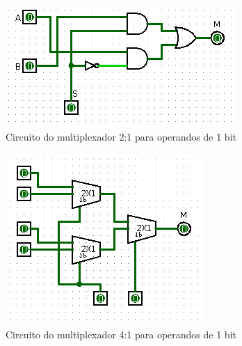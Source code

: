 \documentclass[
	12pt,				%
	openright,			%
	twoside,			%
	a4paper,			%
	english,			%
	french,				%
	spanish,			%
	brazil,				%
	]{abntex2}
\begin{document}
\begin{figure}[H]
	\begin{center}
	    \includegraphics[scale=0.6]{mux21.png}
	\end{center}
\caption{\label{mux21}Circuito do multiplexador 2:1 para operandos de 1 bit}
\end{figure}

\begin{figure}[H]
	\begin{center}
	    \includegraphics[scale=0.6]{mux41.png}
	\end{center}
\caption{\label{mux41}Circuito do multiplexador 4:1 para operandos de 1 bit}
\end{figure}
\end{document}
